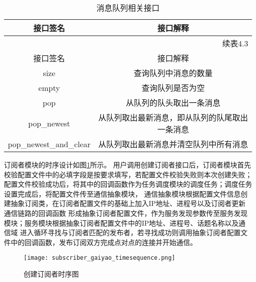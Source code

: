 \begin{longtable}{cc}
  \caption{消息队列相关接口}\label{message_queue_interface}\\
  \toprule
  接口签名 & 接口解释 \\
  \midrule
  \endfirsthead
  \multicolumn{2}{r}{续表4.3}\\
  \toprule
  接口签名 & 接口解释 \\
  \hline
  \endhead
  \endfoot
  \bottomrule
  \endlastfoot

  size & 查询队列中消息的数量\\
  empty & 查询队列是否为空\\
  pop & 从队列的队头取出一条消息\\
  pop\_newest & 从队列取出最新消息，即从队列的队尾取出一条消息\\
  pop\_newest\_and\_clear & 从队列取出最新消息并清空队列中所有消息\\
  \end{longtable}  

订阅者模块的时序设计如图\ref{subscriber_gaiyao_timesequence}所示。
用户调用创建订阅者接口后，订阅者模块首先校验配置文件中的必填字段是按要求填写，若配置文件校验失败则本次创建失败；
配置文件校验成功后，将其中的回调函数作为任务调度模块的调度任务；调度任务设置完成后，将配置文件传至通信抽象模块，
通信抽象模块根据配置文件信息创建抽象订阅类，在订阅者配置文件的基础上加入IP地址、进程号以及订阅者更新通信链路的回调函数
形成抽象订阅者配置文件，作为服务发现参数传至服务发现模块；服务模块根据抽象订阅者配置文件中的IP地址、进程号、话题名称以及通信域
进入循环寻找与订阅者匹配的发布者，若寻找成功则调用抽象订阅者配置文件中的回调函数，发布订阅双方完成点对点的连接并开始通信。
\begin{figure}[H]
  \centering
  \texttt{[image: subscriber\_gaiyao\_timesequence.png]}
  \caption{创建订阅者时序图}
  \label{subscriber_gaiyao_timesequence}
\end{figure}

